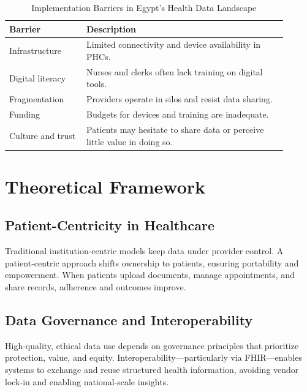 \begin{table}[ht]
    \centering
    \caption{Implementation Barriers in Egypt's Health Data Landscape}
    \label{tab:egypt_barriers}
    \renewcommand{\arraystretch}{1.2}
    \begin{tabular}{|p{0.25\linewidth}|p{0.65\linewidth}|}
        \hline
        \textbf{Barrier}  & \textbf{Description}                                                      \\ \hline
        Infrastructure    & Limited connectivity and device availability in PHCs.                     \\ \hline
        Digital literacy  & Nurses and clerks often lack training on digital tools.                   \\ \hline
        Fragmentation     & Providers operate in silos and resist data sharing.                       \\ \hline
        Funding           & Budgets for devices and training are inadequate.                          \\ \hline
        Culture and trust & Patients may hesitate to share data or perceive little value in doing so. \\ \hline
    \end{tabular}
\end{table}

\section{Theoretical Framework}
\subsection{Patient-Centricity in Healthcare}
Traditional institution-centric models keep data under provider control. A
patient-centric approach shifts ownership to patients, ensuring portability and
empowerment. When patients upload documents, manage appointments, and share
records, adherence and outcomes improve.

\subsection{Data Governance and Interoperability}
High-quality, ethical data use depends on governance principles that prioritize
protection, value, and equity. Interoperability—particularly via FHIR—enables
systems to exchange and reuse structured health information, avoiding vendor
lock-in and enabling national-scale insights.

